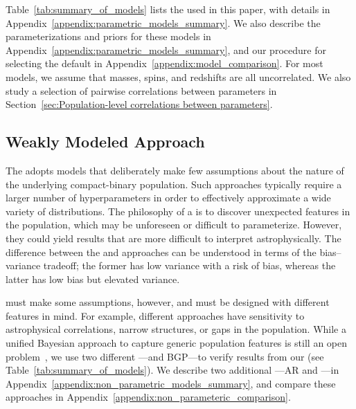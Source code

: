 Table~\ref{tab:summary_of_models} lists the \parametrics used in this paper, with details in Appendix~\ref{appendix:parametric_models_summary}. We also describe the parameterizations and priors for these models in Appendix~\ref{appendix:parametric_models_summary}, and our procedure for selecting the default \parametric in Appendix~\ref{appendix:model_comparison}.
For most models, we assume that masses, spins, and redshifts are all uncorrelated. 
We also study a selection of pairwise correlations between parameters in Section~\ref{sec:Population-level correlations between parameters}.

\subsection{Weakly Modeled Approach}

The \nonparametric adopts models that deliberately make few assumptions about the nature of the underlying compact-binary population.
Such approaches typically require a larger number of hyperparameters in order to effectively approximate a wide variety of distributions.
The philosophy of a \nonparametric is to discover unexpected features in the population, which may be unforeseen or difficult to parameterize. However, they could yield results that are more difficult to interpret astrophysically.
The difference between the \parametricAdj and \nonparametricAdj approaches can be understood in terms of the bias--variance tradeoff; the former has low variance with a risk of bias, whereas the latter has low bias but elevated variance.

\Nonparametrics must make some assumptions, however, and must be designed with different features in mind. 
For example, different approaches have sensitivity to astrophysical correlations, narrow structures, or gaps in the population. 
While a unified Bayesian approach to capture generic population features is still an open problem~\citep{Mandel:2016prl,Tiwari:2020vym,Rinaldi:2021bhm,Edelman:2022ydv,Golomb:2022bon,Payne:2022xan,Toubiana:2023egi,Callister:2023tgi,Ray:2023upk,Farah:2024xub,Heinzel:2024jlc}, we use two different \nonparametrics---\BSpline and \ac{BGP}---to verify results from our \parametrics (see Table~\ref{tab:summary_of_models}). 
We describe two additional \nonparametrics---\ac{AR} and \vamana---in Appendix~\ref{appendix:non_parametric_models_summary}, and compare these approaches in Appendix~\ref{appendix:non_parameteric_comparison}. 
